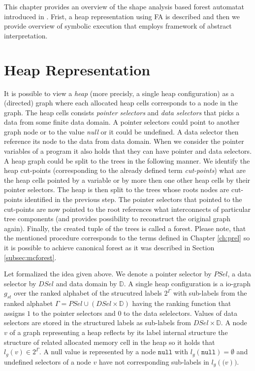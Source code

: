 This chapter provides an overview of the shape analysis based forest automatat introduced in \cite{formalmethods}.
Frist, a heap representation using FA is described and then
we provide overview of symbolic execution that employs framework of abstract interpretation.

\section{Heap Representation}
\label{sec:hd}

It is possible to view a \emph{heap} (more precisly, a single heap configuration)
as a (directed) graph where each allocated heap cells corresponds to a node in the graph.
The heap cells consists \emph{pointer selectors} and \emph{data selectors} that picks a data from some finite data domain.
A pointer selectors could point to another graph node or to the value \emph{null} or it could be undefined.
A data selector then reference its node to the data from data domain.
When we consider the pointer variables of a program it also holds that they can have pointer and data selectors.
A heap graph could be split to the trees in the following manner.
We identify the heap cut-points (corresponding to the already defined term \emph{cut-points})
what are the heap cells pointed by a variable or by more then one other heap cells by their pointer selectors.
The heap is then split to the trees whose roots nodes are cut-points identified in the previous step.
The pointer selectors that pointed to the cut-points are now pointed to the root references what interconnects
of particular tree components (and provides possibility to reconstruct the original graph again).
Finally, the created tuple of the trees is called a forest.
Please note, that the mentioned procedure corresponds to the terms defined in Chapter \ref{ch:prel}
so it is possible to achieve canonical forest as it was described in Section \ref{subsec:mcforest}.

Let formalized the idea given above.
We denote a pointer selector by $PSel$, a data selector by $DSel$ and data domain by $\mathbb{D}$.
A single heap configuration is a io-graph $g_{st}$ over the ranked alphabet of the strucutred labels $2^\Gamma$
with sub-labels from the ranked alphabet $\Gamma = PSel \cup (DSel \times \mathbb{D})$ having the
ranking function that assigns $1$ to the pointer selectors and $0$ to the data selelectors.
Values of data selectors are stored in the structured labels as sub-labels from $DSel \times \mathbb{D}$.
A node $v$ of a graph representing a heap reflects by its label internal structure the structure of
related allocated memory cell in the heap so it holds that $l_g(v) \in 2^\Gamma$.
A null value is represented by a node $\texttt{null}$ with $l_g(\texttt{null}) = \emptyset$
and undefined selectors of a node $v$ have not corresponding  sub-labels in $l_g(\texttt(v))$.

